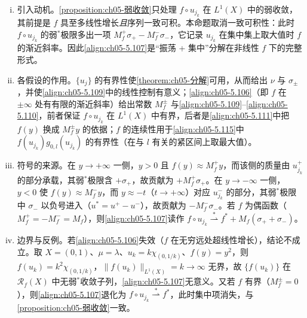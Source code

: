\documentclass[../../main.tex]{subfiles}
\begin{document}
\begin{remark}\label{remark:ch05-函数弱星注}
\begin{enumerate}[(i)]
\item 引入动机。\cref{proposition:ch05-弱收敛}只处理 $f\circ u_{j_k}$ 在 $L^1(X)$ 中的弱收敛，其前提是 $f$ 具至多线性增长\emph{且}序列一致可积。本命题取消一致可积性：此时 $f\circ u_{j_k}$ 的弱$^*$极限多出一项 $M^+_f\sigma_+-M^-_f\sigma_-$，它记录 $u_{j_k}$ 在集中集上取大值时 $f$ 的渐近斜率。因此\eqref{align:ch05-5.107}是“振荡 + 集中”分解在非线性 $f$ 下的完整形式。

\item 各假设的作用。$\{u_j\}$ 的有界性使\cref{theorem:ch05-分解}可用，从而给出 $\nu$ 与 $\sigma_\pm$，并使\eqref{align:ch05-5.109}中的线性控制有意义；\eqref{align:ch05-5.106}（即 $f$ 在 $\pm\infty$ 处有有限的渐近斜率）给出常数 $M^\pm_f$ 与\eqref{align:ch05-5.109}--\eqref{align:ch05-5.110}，前者保证 $f\circ u_{j_k}$ 在 $L^1(X)$ 中有界，后者是\eqref{align:ch05-5.111}中把 $f(y)$ 换成 $M^\pm_fy$ 的依据；$f$ 的连续性用于\eqref{align:ch05-5.115}中 $f(u_{j_k})g_{0,l}(u_{j_k})$ 的有界性（在与 $l$ 有关的紧区间上取最大值）。

\item 符号的来源。在 $y\to+\infty$ 一侧，$y>0$ 且 $f(y)\approx M^+_fy$，而该侧的质量由 $u^+_{j_k}$ 的部分承载，其弱$^*$极限含 $+\sigma_+$，故贡献为 $+M^+_f\sigma_+$。在 $y\to-\infty$ 一侧，$y<0$ 使 $f(y)\approx M^-_fy$，而 $y\approx-t$（$t\to+\infty$）对应 $u^-_{j_k}$ 的部分，其弱$^*$极限中 $\sigma_-$ 以负号进入（$u^*=u^+-u^-$），故贡献为 $-M^-_f\sigma_-$。若 $f$ 为偶函数（$M^+_f=-M^-_f=M_f$），则\eqref{align:ch05-5.107}读作 $f\circ u_{j_k}\stackrel{*}{\rightharpoonup}f^*+M_f(\sigma_++\sigma_-)$。

\item 边界与反例。若\eqref{align:ch05-5.106}失效（$f$ 在无穷远处超线性增长），结论不成立。取 $X=(0,1)$、$\mu=\lambda$、$u_k=k\chi_{(0,1/k)}$、$f(y)=y^2$，则 $f(u_k)=k^2\chi_{(0,1/k)}$，$\|f(u_k)\|_{L^1(X)}=k\to\infty$ 无界，故 $\{f(u_k)\}$ 在 $\mathscr{R}_f(X)$ 中无弱$^*$收敛子列，\eqref{align:ch05-5.107}无意义。又若 $f$ 有界（$M^\pm_f=0$），则\eqref{align:ch05-5.107}退化为 $f\circ u_{j_k}\stackrel{*}{\rightharpoonup}f^*$，此时集中项消失，与\cref{proposition:ch05-弱收敛}一致。
\end{enumerate}
\end{remark}
\end{document}
